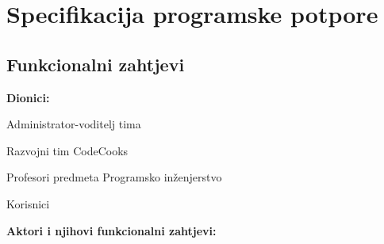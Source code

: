 \chapter{Specifikacija programske potpore}
	
	\section{Funkcionalni zahtjevi}
			
			\noindent \textbf{Dionici:}
			
			\begin{packed_enum}
				
				\item Administrator-voditelj tima
				\item Razvojni tim CodeCooks			
				\item Profesori predmeta Programsko inženjerstvo
				\item Korisnici
				
			\end{packed_enum}
			
			\noindent \textbf{Aktori i njihovi funkcionalni zahtjevi:}
			
